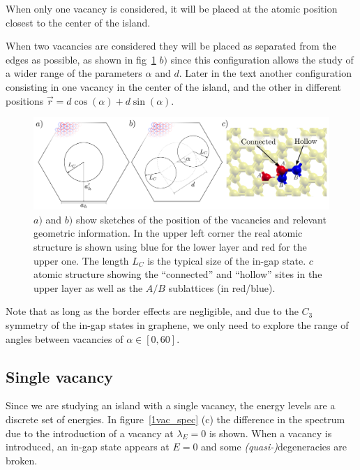 When only one vacancy is considered, it will be placed at the atomic position closest to the center of the island.

When two vacancies are considered they will be placed as separated from the edges as possible, as shown in fig~\ref{geo_sketch} $b)$ since this configuration allows the study of a wider range of the parameters $\alpha$ and $d$. Later in the text another configuration consisting in one vacancy in the center of the island, and the other in different positions $\vec{r}=d\cos(\alpha)+d\sin(\alpha)$.
\begin{figure}[h!]
\centering
\includegraphics[width=\textwidth]{chapter06/figures/vacs_sketch.pdf}
\vspace{-15pt}
\caption{$a)$ and $b)$ show sketches of the position of the vacancies and relevant geometric information. In the upper left corner the real atomic structure is shown using blue for the lower layer and red for the upper one. The length $L_C$ is the typical size of the in-gap state. $c$ atomic structure showing the ``connected'' and ``hollow'' sites in the upper layer as well as the $A/B$ sublattices (in red/blue).}
\label{geo_sketch}
\end{figure}
\FloatBarrier

Note that as long as the border effects are negligible, and due to the $C_3$ symmetry of the in-gap states in graphene, we only need to explore the range of angles between vacancies of $\alpha\in\left[0,60\right]$.


\subsection{Single vacancy} %
Since we are studying an island with a single vacancy, the energy levels are a discrete set of energies. In figure~\ref{1vac_spec} (c) the difference in the spectrum due to the introduction of a vacancy at $\lambda_E=0$ is shown. When a vacancy is introduced, an in-gap state appears at $E=0$ and some \emph{(quasi-)}degeneracies are broken.

